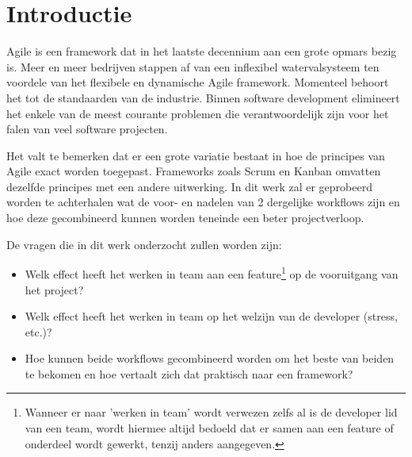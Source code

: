 
\section{Introductie} %
\label{sec:introductie}

%


Agile is een framework dat in het laatste decennium aan een grote opmars bezig is. Meer en meer bedrijven stappen af van een inflexibel watervalsysteem ten voordele van het flexibele en dynamische Agile framework. Momenteel behoort het tot de standaarden van de industrie. Binnen software development elimineert het enkele van de meest courante problemen die verantwoordelijk zijn voor het falen van veel software projecten.

Het valt te bemerken dat er een grote variatie bestaat in hoe de principes van Agile exact worden toegepast. Frameworks zoals Scrum en Kanban omvatten dezelfde principes met een andere uitwerking. In dit werk zal er geprobeerd worden te achterhalen wat de voor- en nadelen van 2 dergelijke workflows zijn en hoe deze gecombineerd kunnen worden teneinde een beter projectverloop. 

De vragen die in dit werk onderzocht zullen worden zijn:
\begin{itemize}
\item Welk effect heeft het werken in team aan een feature\footnote{Wanneer er naar 'werken in team' wordt verwezen zelfs al is de developer lid van een team, wordt hiermee altijd bedoeld dat er samen aan een feature of onderdeel wordt gewerkt, tenzij anders aangegeven.} op de vooruitgang van het project?
\item Welk effect heeft het werken in team op het welzijn van de developer (stress, etc.)?
\item Hoe kunnen beide workflows gecombineerd worden om het beste van beiden te bekomen en hoe vertaalt zich dat praktisch naar een framework?
\end{itemize}

